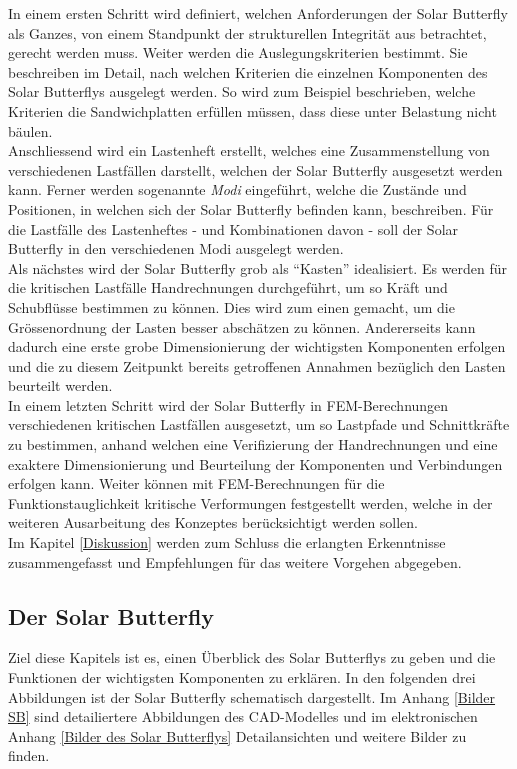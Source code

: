 In einem ersten Schritt wird definiert, welchen Anforderungen der Solar Butterfly als Ganzes, von einem Standpunkt der strukturellen Integrität aus betrachtet, gerecht werden muss. Weiter werden die Auslegungskriterien bestimmt. Sie beschreiben im Detail, nach welchen Kriterien die einzelnen Komponenten des Solar Butterflys ausgelegt werden. So wird zum Beispiel beschrieben, welche Kriterien die Sandwichplatten erfüllen müssen, dass diese unter Belastung nicht bäulen.\\
Anschliessend wird ein Lastenheft erstellt, welches eine Zusammenstellung von verschiedenen Lastfällen darstellt, welchen der Solar Butterfly ausgesetzt werden kann. Ferner werden sogenannte \emph{Modi} eingeführt, welche die Zustände und Positionen, in welchen sich der Solar Butterfly befinden kann, beschreiben. Für die Lastfälle des Lastenheftes - und Kombinationen davon - soll der Solar Butterfly in den verschiedenen Modi ausgelegt werden.\\
Als nächstes wird der Solar Butterfly grob als ``Kasten'' idealisiert. Es werden für die kritischen Lastfälle Handrechnungen durchgeführt, um so Kräft und Schubflüsse bestimmen zu können. Dies wird zum einen gemacht, um die Grössenordnung der Lasten besser abschätzen zu können. Andererseits kann dadurch eine erste grobe Dimensionierung der wichtigsten Komponenten erfolgen und die zu diesem Zeitpunkt bereits getroffenen Annahmen bezüglich den Lasten beurteilt werden.\\
In einem letzten Schritt wird der Solar Butterfly in FEM-Berechnungen verschiedenen kritischen Lastfällen ausgesetzt, um so Lastpfade und Schnittkräfte zu bestimmen, anhand welchen eine Verifizierung der Handrechnungen und eine exaktere Dimensionierung und Beurteilung der Komponenten und Verbindungen erfolgen kann. Weiter können mit FEM-Berechnungen für die Funktionstauglichkeit kritische Verformungen festgestellt werden, welche in der weiteren Ausarbeitung des Konzeptes berücksichtigt werden sollen.\\
Im Kapitel \ref{Diskussion} werden zum Schluss die erlangten Erkenntnisse zusammengefasst und Empfehlungen für das weitere Vorgehen abgegeben.

\subsection{Der Solar Butterfly}
Ziel diese Kapitels ist es, einen Überblick des Solar Butterflys zu geben und die Funktionen der wichtigsten Komponenten zu erklären.
In den folgenden drei Abbildungen ist der Solar Butterfly schematisch dargestellt. Im Anhang \ref{Bilder SB} sind detailiertere Abbildungen des CAD-Modelles und im elektronischen Anhang \ref{Bilder des Solar Butterflys} Detailansichten und weitere Bilder zu finden.

